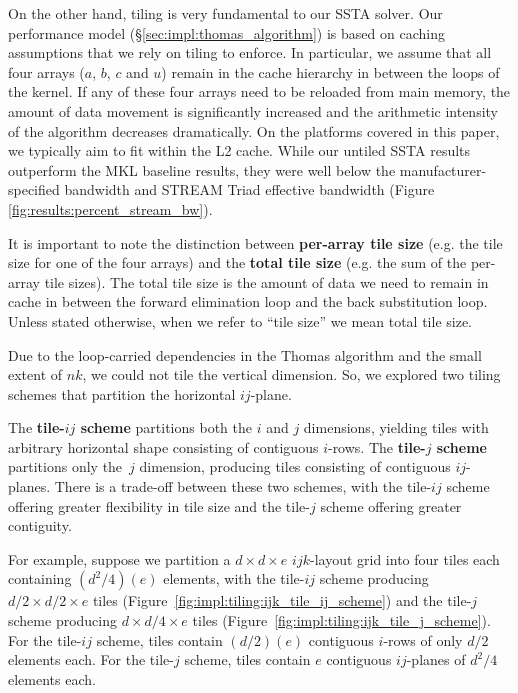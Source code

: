 \documentclass[10pt, conference, compsocconf]{IEEEtran}
\begin{document}
On the other hand, tiling is very fundamental to our SSTA solver.
Our performance model (\S\ref{sec:impl:thomas_algorithm})
  is based on caching assumptions that we rely on tiling to enforce.
In particular, we assume that all four arrays (\(a\), \(b\), \(c\) and \(u\))
  remain in the cache hierarchy in between the loops of the kernel. 
If any of these four arrays need to be reloaded from main memory, the amount of
  data movement is significantly increased and the arithmetic intensity of the
  algorithm decreases dramatically.
On the platforms covered in this paper, we typically aim to fit within the L2
  cache.
While our untiled SSTA results outperform the MKL baseline results, they were
  well below the manufacturer-specified bandwidth and STREAM Triad effective
  bandwidth (Figure \ref{fig:results:percent_stream_bw}).

It is important to note the distinction between \textbf{per-array tile size}
  (e.g. the tile size for one of the four arrays) and the
  \textbf{total tile size} (e.g. the sum of the per-array tile sizes).
The total tile size is the amount of data we need to remain in cache in between
  the forward elimination loop and the back substitution loop.
Unless stated otherwise, when we refer to ``tile size'' we mean
  total tile size.

Due to the loop-carried dependencies in the Thomas algorithm and the small
  extent of \(nk\), we could not tile the vertical dimension. So, we explored
  two tiling schemes that partition the horizontal \(ij\)-plane.

The \textbf{tile-\(ij\) scheme} partitions both the \(i\) and \(j\) dimensions,
  yielding tiles with arbitrary horizontal shape consisting of contiguous
  \(i\)-rows.
The \textbf{tile-\(j\) scheme} partitions only the~\(j\) dimension, producing
  tiles consisting of contiguous \(ij\)-planes.
There is a trade-off between these two schemes, with the tile-\(ij\) scheme
  offering greater flexibility in tile size and the tile-\(j\) scheme offering
  greater contiguity. 

For example, suppose we partition a \(d \times d \times e\) \(ijk\)-layout
  grid into four tiles each containing \((d^2/4)(e)\) elements, with the
  tile-\(ij\) scheme producing
  \(d/2 \times d/2 \times e\) tiles
  (Figure~\ref{fig:impl:tiling:ijk_tile_ij_scheme})
  and the tile-\(j\) scheme producing
  \(d \times d/4 \times e\) tiles
  (Figure~\ref{fig:impl:tiling:ijk_tile_j_scheme}).
For the tile-\(ij\) scheme, tiles contain \((d/2)(e)\) contiguous
  \(i\)-rows of only \(d/2\) elements each.
For the tile-\(j\) scheme, tiles contain \(e\) contiguous \(ij\)-planes of
  \(d^2/4\) elements each.
\end{document}
